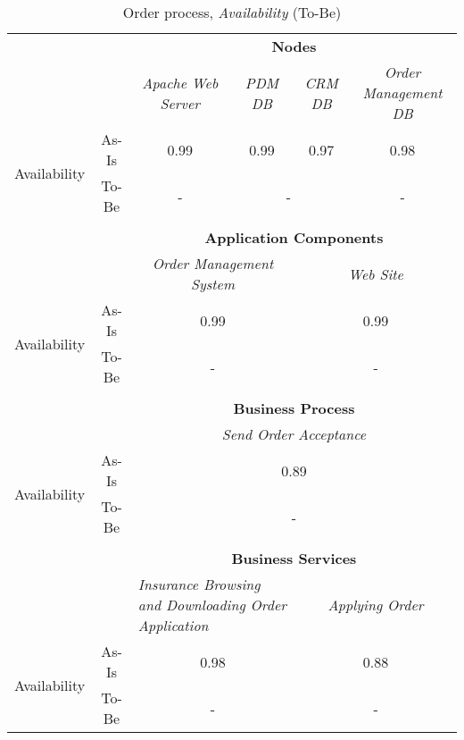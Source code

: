 \begin{table}[H]
	\centering
	\begin{tabular}{|c|c|p{2cm}|p{2.5cm}|p{2.5cm}|p{2.5cm}|}
		\cline{3-6}

		\multicolumn{2}{c}{} & \multicolumn{4}{|c|}{\textbf{Nodes}} \\ \cline{3-6}
		\multicolumn{2}{c|}{} & \multicolumn{1}{c|}{\textsl{Apache Web Server}} & \multicolumn{1}{c|}{\textsl{PDM DB}} & \multicolumn{1}{c|}{\textsl{CRM DB}} & \multicolumn{1}{c|}{\textsl{Order Management DB}}\\
		\hline
		\multirow{2}{*}{Availability} & As-Is & \multicolumn{1}{c|}{0.99} & \multicolumn{1}{c|}{0.99} & \multicolumn{1}{c|}{0.97} & \multicolumn{1}{c|}{0.98}\\ \cline{2-6}
										& To-Be &\multicolumn{1}{c|}{-} & \multicolumn{2}{c|}{-} & \multicolumn{1}{c|}{-}\\ \hline

		\multicolumn{6}{c}{} \\ \cline{3-6}							
		\multicolumn{2}{c}{} & \multicolumn{4}{|c|}{\textbf{Application Components}} \\ \cline{3-6}
		\multicolumn{2}{c|}{} & \multicolumn{2}{c|}{\textsl{Order Management System}} & \multicolumn{2}{c|}{\textsl{Web Site}}\\
		\hline
		\multirow{2}{*}{Availability} & As-Is & \multicolumn{2}{c|}{0.99} & \multicolumn{2}{c|}{0.99}\\ \cline{2-6}
										& To-Be &\multicolumn{2}{c|}{-} & \multicolumn{2}{c|}{-}\\ \hline

		\multicolumn{6}{c}{} \\ \cline{3-6}
		\multicolumn{2}{c}{} & \multicolumn{4}{|c|}{\textbf{Business Process}} \\ \cline{3-6}
		\multicolumn{2}{c|}{} & \multicolumn{4}{|c|}{\textsl{Send Order Acceptance}}\\ \hline
		\multirow{2}{*}{Availability} & As-Is & \multicolumn{4}{|c|}{0.89}\\ \cline{2-6}
									   & To-Be & \multicolumn{4}{|c|}{-}\\ \hline
		\multicolumn{6}{c}{} \\ \cline{3-6}
		\multicolumn{2}{c}{} & \multicolumn{4}{|c|}{\textbf{Business Services}} \\ \cline{3-6}

		\multicolumn{2}{c|}{} & \multicolumn{2}{|p{5cm}|}{\textsl{Insurance Browsing and Downloading Order Application}} & \multicolumn{2}{|c|}{\textsl{Applying Order}} \\ \hline
		\multirow{2}{*}{Availability} & As-Is & \multicolumn{2}{|c|}{0.98} & \multicolumn{2}{|c|}{0.88}\\ \cline{2-6}
									   & To-Be & \multicolumn{2}{|c|}{-} & \multicolumn{2}{|c|}{-}\\ \hline
	\end{tabular}
\caption{Order process, \textsl{Availability} (To-Be)} 
\label{tab:order_to_be}
\end{table}